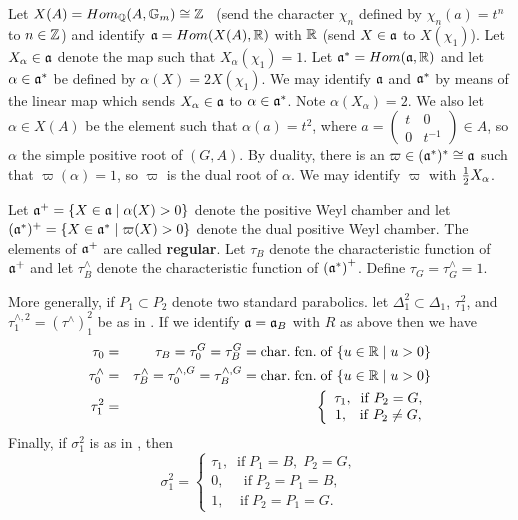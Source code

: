 Let $X(A)=Hom_{{\Bbb{Q}}}(A,{\Bbb{G}}_m)\cong {\Bbb{Z}}$ \
(send the character $\chi _n$ defined by $\chi _n(a)=t^n$
to $n\in {\Bbb{Z}}$) and identify ${{\frak{a}}}=Hom(X(A),\Bbb{R})$
with $\Bbb{R}$ (send $X\in {\frak{a}}$ to $X(\chi _1)$).
Let $X_{\alpha}\in {\frak{a}}$ denote the map such that
$X_{\alpha} (\chi_1)=1$.
Let ${\frak{a}}^{*}=Hom({\frak{a}},\Bbb{R})$ and let $\alpha \in {\frak{a}}^{*}$
be defined by $\alpha (X)=2X(\chi _1)$.
We may identify ${\frak{a}}$ and ${\frak{a}}^*$ by means of the
linear map which sends
$X_{\alpha}\in {\frak{a}}$ to $\alpha\in {\frak{a}}^*$.
Note $\alpha(X_{\alpha} )=2$.
We also let $\alpha \in X(A)$ be the
element such that $\alpha (a)=t^2$, where $a=\left( 
\begin{array}{cc}
t & 0 \\ 
0 & t^{-1}
\end{array}
\right) \in A$, so $\alpha $ the simple positive root of $(G,A)$. By
duality, there is an $\varpi \in ({\frak{a}}^{*})^{*}\cong {\frak{a}}$
such that 
$\varpi (\alpha )=1$, so $\varpi $ is the dual root of $\alpha $. We
may identify $\varpi$ with ${1\over 2}X_{\alpha}$.

Let ${\frak{a}}^{+}=\{X\in {\frak{a}}\;|\;\alpha (X)>0\}$
denote the positive
Weyl chamber and let
$({\frak{a}}^{*})^{+}=\{X\in {\frak{a}}^{*}\;|\;\varpi (X)>0\}$
denote the dual positive Weyl chamber. The elements of
${\frak{a}}^{+} $ are called \textbf{regular}. Let $\tau _B$ denote
the characteristic
function of ${\frak{a}}^{+}$ and let $\tau _B^{\wedge }$ denote the
characteristic function of $({\frak{a}}^{*}\frak{)}^{+}$.
Define $\tau _G=\tau _G^{\wedge }=1$.

More generally, if $P_1\subset P_2$ denote two standard
parabolics. let $\Delta _1^2\subset \Delta _1$, $\tau _1^2$,
and $\tau _1^{\wedge ,2}=(\tau^{\wedge })_1^2$ be as in \cite{A2}.
If we identify ${\frak{a}}={\frak{a}}_B$ with $R$
as above then we have 
\begin{eqnarray}
\tau _0 &=&\tau _B=\tau _0^G=\tau _B^G=\mathrm{char.\;fcn.\;of}
\;\{u\in {\Bbb{R}}\;|\;u>0\} \\
\tau _0^{\wedge }
&=&\tau _B^{\wedge }=\tau _0^{\wedge ,G}
=\tau _B^{\wedge,G}=\mathrm{char.\;fcn.\;of}
\;\{u\in {\Bbb{R}}\;|\;u>0\}  \nonumber \\
\tau _1^2 &=&\left\{ 
\begin{array}{c}
\tau _1,\;\;\mathrm{if}\;P_2=G, \\ 
1,\;\;\;\mathrm{if}\;P_2\neq G,
\end{array}
\right.  \nonumber
\end{eqnarray}
Finally, if $\sigma _1^2$ is as in \cite{A2}, then 
\begin{equation}
\sigma _1^2=\left\{ 
\begin{array}{c}
\tau _1,\;\;\mathrm{if}\;P_1=B,\;P_2=G, \\ 
0,\;\;\;\;\;\mathrm{if}\;P_2=P_1=B, \\ 
1,\;\;\;\;\mathrm{if}\;P_2=P_1=G.
\end{array}
\right.
\end{equation}

